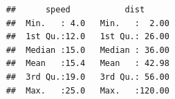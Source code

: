 \documentclass[a4paper]{article}
\begin{document}
    \begin{verbatim}
    ##      speed           dist       
    ##  Min.   : 4.0   Min.   :  2.00  
    ##  1st Qu.:12.0   1st Qu.: 26.00  
    ##  Median :15.0   Median : 36.00  
    ##  Mean   :15.4   Mean   : 42.98  
    ##  3rd Qu.:19.0   3rd Qu.: 56.00  
    ##  Max.   :25.0   Max.   :120.00
    \end{verbatim}
    

  
  
  

\end{document}
